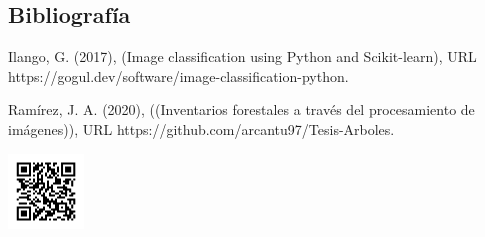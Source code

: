 \documentclass[a0,portrait]{a0poster}
\begin{document}
\begin{multicols}{2}
\section*{Bibliografía}
Ilango, G. (2017), (Image classification using Python and Scikit-learn), URL https://gogul.dev/software/image-classification-python.

Ramírez, J. A. (2020), ((Inventarios forestales a través del procesamiento de
imágenes)), URL https://github.com/arcantu97/Tesis-Arboles.

\hspace*{120mm}\includegraphics[width=0.15\textwidth]{frame.png}
 
\end{multicols}
\end{document}

